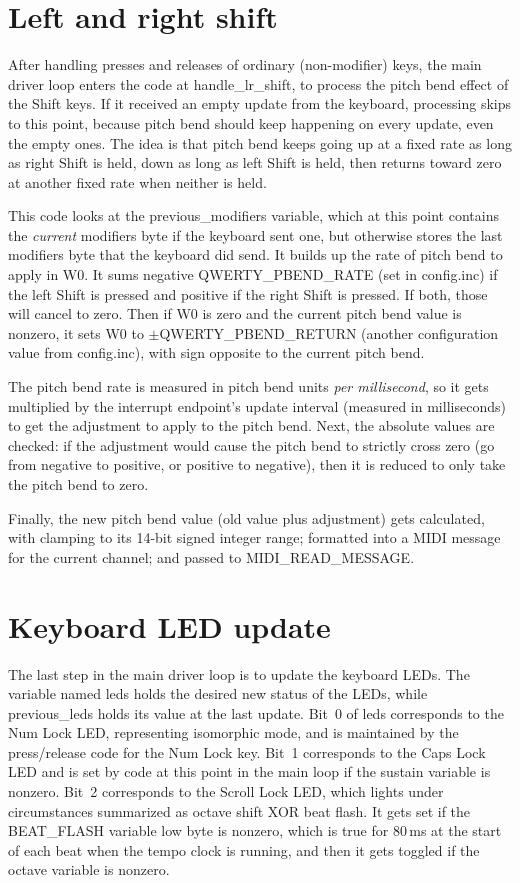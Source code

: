 \section{Left and right shift}

After handling presses and releases of ordinary (non-modifier) keys, the
main driver loop enters the code at handle\_lr\_shift, to process the pitch
bend effect of the Shift keys.  If it received an empty update from the
keyboard, processing skips to this point, because pitch bend should keep
happening on every update, even the empty ones.  The idea is that pitch bend
keeps going up at a fixed rate as long as right Shift is held, down as long as left Shift is
held, then returns toward zero at another fixed rate when neither is held.

This code looks at the previous\_modifiers variable, which at this point
contains the \emph{current} modifiers byte if the keyboard sent one, but
otherwise stores the last modifiers byte that the keyboard did send.  It
builds up the rate of pitch bend to apply in W0.  It sums negative
QWERTY\_PBEND\_RATE (set in config.inc) if the left Shift is pressed and
positive if the right Shift is pressed.  If both, those will cancel to zero. 
Then if W0 is zero and the current pitch bend value is nonzero, it sets W0
to $\pm$QWERTY\_PBEND\_RETURN (another configuration value from config.inc),
with sign opposite to the current pitch bend.

The pitch bend rate is measured in pitch bend units \emph{per millisecond},
so it gets multiplied by the interrupt endpoint's update interval (measured
in milliseconds) to get the adjustment to apply to the pitch bend.  Next,
the absolute values are checked:  if the adjustment would cause the pitch
bend to strictly cross zero (go from negative to positive, or positive to
negative), then it is reduced to only take the pitch bend to zero.

Finally, the new pitch bend value (old value plus adjustment) gets
calculated, with clamping to its 14-bit signed integer range; formatted
into a MIDI message for the current channel; and passed to
MIDI\_READ\_MESSAGE.


\section{Keyboard LED update}

The last step in the main driver loop is to update the keyboard LEDs.  The
variable named leds holds the desired new status of the LEDs, while
previous\_leds holds its value at the last update.  Bit~0 of leds
corresponds to the Num Lock LED, representing isomorphic mode, and is
maintained by the press/release code for the Num Lock key.  Bit~1
corresponds to the Caps Lock LED and is set by code at this point in the
main loop if the sustain variable is nonzero.  Bit~2 corresponds to the
Scroll Lock LED, which lights under circumstances summarized as octave shift
XOR beat flash.  It gets set if the BEAT\_FLASH variable low byte is
nonzero, which is true for 80\,ms at the start of each beat when the tempo
clock is running, and then it gets toggled if the octave variable is
nonzero.

